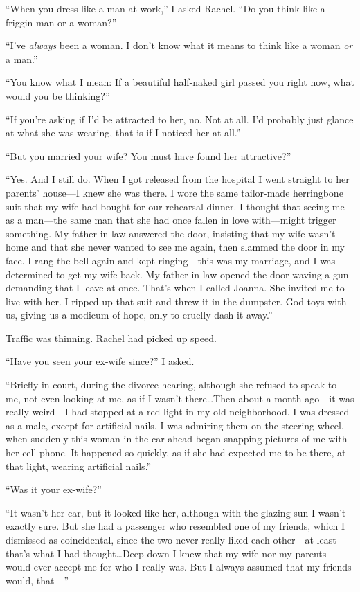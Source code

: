 ``When you dress like a man at work,'' I asked Rachel. ``Do you think
like a friggin man or a woman?''

``I've \emph{always} been a woman. I don't know what it means to think
like a woman \emph{or} a man.''

``You know what I mean: If a beautiful half-naked girl passed you right
now, what would you be thinking?''

``If you're asking if I'd be attracted to her, no. Not at all. I'd
probably just glance at what she was wearing, that is if I noticed her
at all.''

``But you married your wife? You must have found her attractive?''

``Yes. And I still do. When I got released from the hospital I went
straight to her parents' house---I knew she was there. I wore the same
tailor-made herringbone suit that my wife had bought for our rehearsal
dinner. I thought that seeing me as a man---the same man that she had
once fallen in love with---might trigger something. My father-in-law
answered the door, insisting that my wife wasn't home and that she never
wanted to see me again, then slammed the door in my face. I rang the
bell again and kept ringing---this was my marriage, and I was determined
to get my wife back. My father-in-law opened the door waving a gun
demanding that I leave at once. That's when I called Joanna. She invited
me to live with her. I ripped up that suit and threw it in the dumpster.
God toys with us, giving us a modicum of hope, only to cruelly dash it
away.''

Traffic was thinning. Rachel had picked up speed.

``Have you seen your ex-wife since?'' I asked.

``Briefly in court, during the divorce hearing, although she refused to
speak to me, not even looking at me, as if I wasn't there\ldots Then
about a month ago---it was really weird---I had stopped at a red light
in my old neighborhood. I was dressed as a male, except for artificial
nails. I was admiring them on the steering wheel, when suddenly this
woman in the car ahead began snapping pictures of me with her cell
phone. It happened so quickly, as if she had expected me to be there, at
that light, wearing artificial nails.''

``Was it your ex-wife?''

``It wasn't her car, but it looked like her, although with the glazing
sun I wasn't exactly sure. But she had a passenger who resembled one of
my friends, which I dismissed as coincidental, since the two never
really liked each other---at least that's what I had thought\ldots Deep
down I knew that my wife nor my parents would ever accept me for who I
really was. But I always assumed that my friends would, that---''

